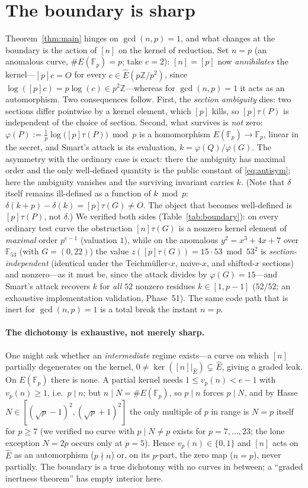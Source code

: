 \documentclass[11pt]{article}
\theoremstyle{definition}
\newcommand{\Fp}{\mathbb{F}_p}
\newcommand{\Z}{\mathbb{Z}}
\newcommand{\Ehat}{\widehat{E}}
\begin{document}
\section{The boundary is sharp}\label{sec:boundary}

Theorem~\ref{thm:main} hinges on $\gcd(n,p)=1$, and what changes at the
boundary is the action of $[n]$ on the kernel of reduction. Set $n=p$ (an
anomalous curve, $\#E(\Fp)=p$; take $e=2$): $[n]=[p]$ now
\emph{annihilates} the kernel---$[p]c=O$ for every
$c\in\Ehat(p\Z/p^2)$, since $\log([p]c)=p\log(c)\in p^2\Z$---whereas for
$\gcd(n,p)=1$ it acts as an automorphism. Two consequences follow. First,
the \emph{section ambiguity} dies: two sections differ pointwise by a
kernel element, which $[p]$ kills, so $[p]\tau(P)$ is independent of the
choice of section. Second, what survives is \emph{not} zero:
$\varphi(P):=\tfrac1p\log\!\big([p]\tau(P)\big)\bmod p$ is a homomorphism
$E(\Fp)\to\Fp$, linear in the secret, and Smart's attack is its
evaluation, $k=\varphi(Q)/\varphi(G)$. The asymmetry with the ordinary
case is exact: there the ambiguity has maximal order and the only
well-defined quantity is the public constant of \eqref{eq:antisym}; here
the ambiguity vanishes and the surviving invariant carries $k$. (Note
that $\delta$ itself remains ill-defined as a function of $k\bmod p$:
$\delta(k+p)-\delta(k)=[p]\tau(G)\neq O$. The object that becomes
well-defined is $[p]\tau(P)$, not $\delta$.) We verified both sides
(Table~\ref{tab:boundary}): on every ordinary test curve the obstruction
$[n]\tau(G)$ is a nonzero kernel element of \emph{maximal} order
$p^{e-1}$ (valuation $1$), while on the anomalous $y^2=x^3+4x+7$ over
$\mathbb F_{53}$ (with $G=(0,22)$) the value
$z([p]\tau(G))=15\cdot 53\bmod 53^2$ is \emph{section-independent}
(identical under the Teichm\"uller-$x$, naive-$x$, and shifted-$x$
sections) and nonzero---as it must be, since the attack divides by
$\varphi(G)=15$---and Smart's attack recovers $k$ for \emph{all} $52$
nonzero residues $k\in[1,p-1]$ ($52/52$; an exhaustive implementation
validation, Phase~51). The same code path that is inert for $\gcd(n,p)=1$
is a total break the instant $n=p$.

\paragraph{The dichotomy is exhaustive, not merely sharp.} One might ask
whether an \emph{intermediate} regime exists---a curve on which $[n]$
partially degenerates on the kernel, $0\neq\ker([n]|_{\Ehat})\subsetneq
\Ehat$, giving a graded leak. On $E(\Fp)$ there is none. A partial kernel
needs $1\le v_p(n)<e-1$ with $v_p(n)\ge1$, i.e.\ $p\mid n$; but $n\mid
N=\#E(\Fp)$, so $p\mid n$ forces $p\mid N$, and by Hasse
$N\in[(\sqrt p-1)^2,(\sqrt p+1)^2]$ the only multiple of $p$ in range is
$N=p$ itself for $p\ge7$ (we verified no curve with $p\mid N\neq p$
exists for $p=7,\dots,23$; the lone exception $N=2p$ occurs only at
$p=5$). Hence $v_p(n)\in\{0,1\}$ and $[n]$ acts on $\Ehat$ as an
automorphism ($p\nmid n$) or, on its $p$-part, the zero map ($n=p$),
never partially. The boundary is a true dichotomy with no curves in
between; a ``graded inertness theorem'' has empty interior here.
\end{document}
